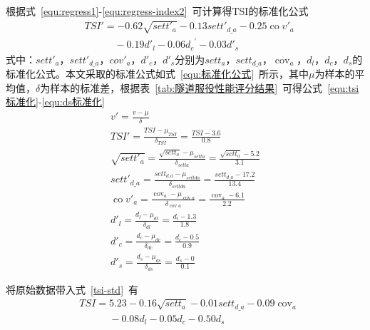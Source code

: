 根据式~\ref{equ:regress1}-\ref{equ:regress-index2}~可计算得TSI的标准化公式
\begin{align}
  \label{tsi-std}
  & TS{I}'=-0.62\sqrt{set{{{{t}'}}_{a}}}-0.13set{{{{t}'}}_{d\_a}}-0.25\operatorname{co}{{{{v}'}}_{a}} \\ 
 & \quad \quad \quad -0.19{{{{d}'}}_{l}}-0.06{{d}_{c}}^{\prime }-0.03{{{{d}'}}_{s}} \nonumber
\end{align}
式中：${set{{{{t}'}}_{a}}}$，$set{{{t}'}_{d\_a}}$，${co}{{{v}'}_{a}}$，${{d}'_{c}}$，${{{d}'}_{s}}$分别为${set{{t}_{a}}}$，$set{{t}_{d\_a}}$，${{\operatorname{cov}}_{a}}$，${{d}_{l}}$，${{d}_{c}}$，${{d}_{s}}$的标准化公式。本文采取的标准公式如式~\ref{equ:标准化公式}~所示，其中$\mu$为样本的平均值，$\delta$为样本的标准差，根据表~\ref{tab:隧道服役性能评分结果}~可得公式~\ref{equ:tsi标准化}-\ref{equ:ds标准化}
\begin{gather}
 \label{equ:标准化公式} 
    {v}'=\frac{v-\mu }{\delta }\\
  \label{equ:tsi标准化}
    TS{I}'=\frac{TSI-{{\mu }_{TSI}}}{{{\delta }_{TSI}}}=\frac{TSI-3.6}{0.8} \\ 
  \label{equ:setta标准化}
    \sqrt{set{{{{t}'}}_{a}}}=\frac{\sqrt{set{{t}_{a}}}-{{\mu }_{setta}}}{{{\delta }_{setta}}}=\frac{\sqrt{set{{t}_{a}}}-5.2}{3.1} \\ 
 \label{equ:settda标准化}
    set{{{{t}'}}_{d\_a}}=\frac{set{{t}_{d\_a}}-{{\mu }_{settda}}}{{{\delta }_{settda}}}=\frac{set{{t}_{d\_a}}-17.2}{13.4} \\ 
 \label{equ:cova标准化}
    \operatorname{co}{{{{v}'}}_{a}}=\frac{{{\operatorname{cov}}_{a}}-{{\mu }_{\operatorname{cov}a}}}{{{\delta }_{\operatorname{cov}a}}}=\frac{{{\operatorname{cov}}_{a}}-6.1}{2.2} \\ 
 \label{equ:dl标准化}
    {{{{d}'}}_{l}}=\frac{{{d}_{l}}-{{\mu }_{dl}}}{{{\delta }_{dl}}}=\frac{{{d}_{l}}-1.3}{1.8} \\ 
 \label{equ:dc标准化}
    {{{{d}'}}_{c}}=\frac{{{d}_{c}}-{{\mu }_{dc}}}{{{\delta }_{dc}}}=\frac{{{d}_{c}}-0.5}{0.9} \\ 
 \label{equ:ds标准化}
    {{{{d}'}}_{s}}=\frac{{{d}_{s}}-{{\mu }_{ds}}}{{{\delta }_{ds}}}=\frac{{{d}_{s}}-0}{0.1}
\end{gather}


将原始数据带入式~\ref{tsi-std}~有
\begin{align}
  \label{tsi}
  & TSI=5.23-0.16\sqrt{set{{t}_{a}}}-0.01set{{t}_{d\_a}}-0.09{{\operatorname{cov}}_{a}} \\ 
 & \quad \quad \quad -0.08{{d}_{l}}-0.05{{d}_{c}}-0.50{{d}_{s}} \nonumber 
\end{align}

